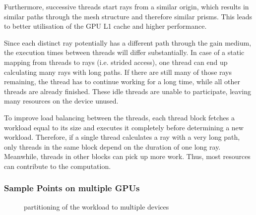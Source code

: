 Furthermore, successive threads start rays from a similar origin, which results
in similar paths through the mesh structure and therefore similar prisms. This
leads to better utilisation of the GPU L1 cache and higher performance.

Since each distinct ray potentially has a different path through the gain
medium, the execution times between threads will differ substantially. In case
of a static mapping from threads to rays (i.e. strided access), one thread can
end up calculating many rays with long paths. If there are still many of those
rays remaining, the thread has to continue working for a long time, while all
other threads are already finished. These idle threads are unable to
participate, leaving many resources on the device unused.

To improve load balancing between the threads, each thread block fetches a
workload equal to its size and executes it completely before determining a new
workload. Therefore, if a single thread calculates a ray with a very long path,
only threads in the same block depend on the duration of one long ray.
Meanwhile, threads in other blocks can pick up more work. Thus, most resources
can contribute to the computation.
    
\subsubsection{Sample Points on multiple GPUs}
\label{subsubsec:multigpu}
\begin{figure}[H]
  \centerline
  {}
  \caption{partitioning of the workload to multiple devices}
  \label{graphic:multigpu}
\end{figure}

